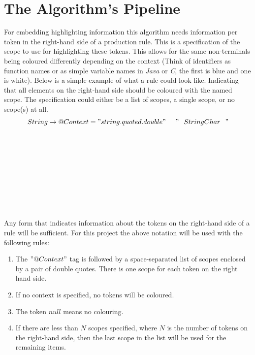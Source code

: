 \section{The Algorithm's Pipeline} \label{sec:Pipeline}
For embedding highlighting information this algorithm needs information per token in the right-hand side of a production rule. This is a specification of the scope to use for highlighting these tokens. This allows for the same non-terminals being coloured differently depending on the context (Think of identifiers as function names or as simple variable names in \textit{Java} or \textit{C}, the first is blue and one is white). Below is a simple example of what a rule could look like. Indicating that all elements on the right-hand side should be coloured with the named scope. The specification could either be a list of scopes, a single scope, or no scope(s) at all.
\begin{equation*}String \rightarrow @Context="string.quoted.double" \hspace{.2in}"\hspace{.1in} StringChar \hspace{.1in}"\end{equation*}\\\\\\\\\\\\\\\\\\
Any form that indicates information about the tokens on the right-hand side of a rule will be sufficient. For this project the above notation will be used with the following rules:
\begin{enumerate}
\item The $"@Context"$ tag is followed by a space-separated list of scopes enclosed by a pair of double quotes. There is one scope for each token on the right hand side. 
\item If no context is specified, no tokens will be coloured.
\item The token $null$ means no colouring.
\item If there are less than $N$ scopes specified, where $N$ is the number of tokens on the right-hand side, then the last scope in the list will be used for the remaining items.
\end{enumerate}
 
